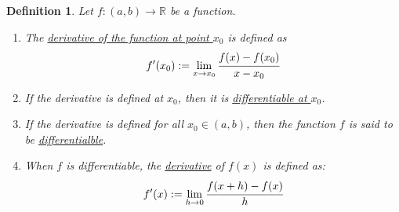 \documentclass[]{article}
\newcommand{\R}{\mathbb{R}}
\newtheorem{definition}{Definition}
\begin{document}
\begin{definition}\label{def:diff_fun}
    Let $f : (a,b) \to \R$ be a function.    
    \begin{enumerate}
        \item The \emph{\underline{derivative of the function at point $x_0$}} is defined as
        \[
            f'(x_0) := \lim_{x \to x_0} \cfrac{f(x) - f(x_0)}{x - x_0}
        \]
        \item If the derivative is defined at $x_0$, then it is \emph{\underline{differentiable at $x_0$}}.
        \item If the derivative is defined for all $x_0 \in (a,b)$, then the function $f$ is said to be \emph{\underline{differentialble}}.
        \item When $f$ is differentiable, the \underline{\emph{derivative}} of $f(x)$ is defined as:
        \[
            f'(x) := \lim_{h \to 0} \cfrac{f(x + h) - f(x)}{h}
        \]
    \end{enumerate}
\end{definition}
\end{document}
